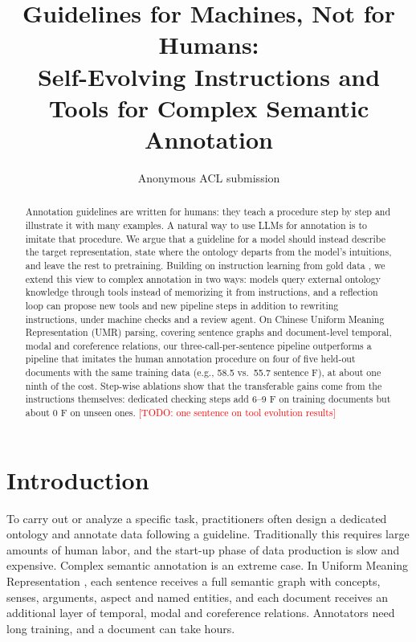 \documentclass[11pt]{article}
\title{Guidelines for Machines, Not for Humans:\\
Self-Evolving Instructions and Tools for Complex Semantic Annotation}
\author{Anonymous ACL submission}
\newcommand{\umr}{\textsc{UMR}\xspace}
\newcommand{\todo}[1]{\textcolor{red}{[TODO: #1]}}
\begin{document}
\maketitle

\begin{abstract}
Annotation guidelines are written for humans: they teach a procedure step by step and illustrate it with many examples. A natural way to use LLMs for annotation is to imitate that procedure. We argue that a guideline for a model should instead describe the target representation, state where the ontology departs from the model's intuitions, and leave the rest to pretraining. Building on instruction learning from gold data \citep{acl2026base}, we extend this view to complex annotation in two ways: models query external ontology knowledge through tools instead of memorizing it from instructions, and a reflection loop can propose new tools and new pipeline steps in addition to rewriting instructions, under machine checks and a review agent. On Chinese Uniform Meaning Representation (\umr) parsing, covering sentence graphs and document-level temporal, modal and coreference relations, our three-call-per-sentence pipeline outperforms a pipeline that imitates the human annotation procedure on four of five held-out documents with the same training data (e.g., 58.5 vs.\ 55.7 sentence F), at about one ninth of the cost. Step-wise ablations show that the transferable gains come from the instructions themselves: dedicated checking steps add 6--9 F on training documents but about 0 F on unseen ones. \todo{one sentence on tool evolution results}
\end{abstract}

\section{Introduction}

To carry out or analyze a specific task, practitioners often design a dedicated ontology and annotate data following a guideline. Traditionally this requires large amounts of human labor, and the start-up phase of data production is slow and expensive. Complex semantic annotation is an extreme case. In Uniform Meaning Representation \citep[\umr;][]{bonn2023umr,gysel2021design}, each sentence receives a full semantic graph with concepts, senses, arguments, aspect and named entities, and each document receives an additional layer of temporal, modal and coreference relations. Annotators need long training, and a document can take hours.
\end{document}
